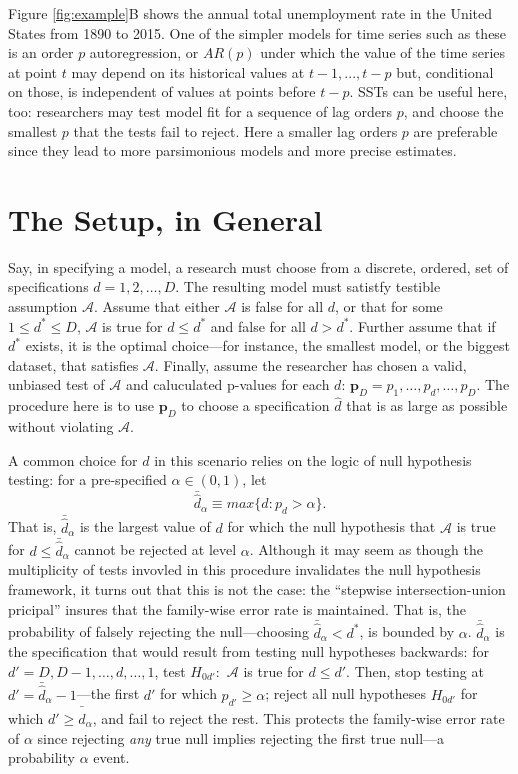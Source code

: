 \documentclass[12pt]{article}\usepackage[]{graphicx}\usepackage[]{color}
\newcommand{\dalphaU}{\bar{\hat{d}}_\alpha}
\newcommand{\dstar}{d^*}
\begin{document}
Figure \ref{fig:example}B shows the annual total unemployment rate in the
United States from 1890 to 2015.
One of the simpler models for time series such as these is an order
$p$ autoregression, or $AR(p)$ under which the value of the time
series at point $t$ may depend on its historical values at
$t-1,...,t-p$ but, conditional on those, is independent of values at
points before $t-p$.
SSTs can be useful here, too: researchers may test model fit for a
sequence of lag orders $p$, and choose the smallest $p$ that the tests
fail to reject.
Here a smaller lag orders $p$ are preferable since they lead to more
parsimonious models and more precise estimates.



\section{The Setup, in General}\label{sec:setup}

Say, in specifying a model, a research must choose from a discrete,
ordered, set of specifications $d=1,2,\dots,D$.
The resulting model must satistfy testible assumption $\mathcal{A}$.
Assume that either $\mathcal{A}$ is false for all $d$, or that for
some $1\le \dstar\le D$, $\mathcal{A}$ is true for $d\le \dstar$ and false
for all $d>\dstar$.
Further assume that if $\dstar$ exists, it is the optimal choice---for
instance, the smallest model, or the biggest dataset, that satisfies
$\mathcal{A}$.
Finally, assume the researcher has chosen a valid, unbiased test of
$\mathcal{A}$ and caluculated p-values for each $d$:
$\bm{p}_D=p_1,\dots,p_d,\dots,p_D$.
The procedure here is to use $\bm{p}_D$ to choose a specification
$\hat{d}$ that is as large as possible without violating
$\mathcal{A}$.


A common choice for $d$ in this scenario relies on the logic of null
hypothesis testing: for a pre-specified $\alpha \in (0,1)$, let
\begin{equation*}
\dalphaU \equiv max\{d : p_d>\alpha\}.
\end{equation*}
That is, $\dalphaU$ is the largest value of $d$ for which the
null hypothesis that $\mathcal{A}$ is true for $d\le \dalphaU$
cannot be rejected at level $\alpha$.
Although it may seem as though the multiplicity of tests invovled in
this procedure invalidates the null hypothesis framework, it turns out
that this is not the case: the ``stepwise intersection-union
pricipal'' \citet{berger1988, rosenbaum2008,hansen2015} insures that the
family-wise error rate is maintained.
That is, the probability of falsely rejecting the null---choosing
$\dalphaU<\dstar$, is bounded by $\alpha$.
$\dalphaU$ is the specification that would result from testing null
hypotheses backwards: for $d'=D,D-1,\dots,d,\dots,1$, test $H_{0d'}:$
$\mathcal{A}$ is true for $d\le d'$.
Then, stop testing at $d'=\dalphaU -1$---the first $d'$ for which
$p_{d'} \ge \alpha$; reject all null hypotheses $H_{0d'}$ for which
$d'\ge \dalphaU$, and fail to reject the rest.
This protects the family-wise error rate of $\alpha$ since rejecting
\emph{any} true null implies rejecting the first true null---a
probability $\alpha$ event.
\end{document}
